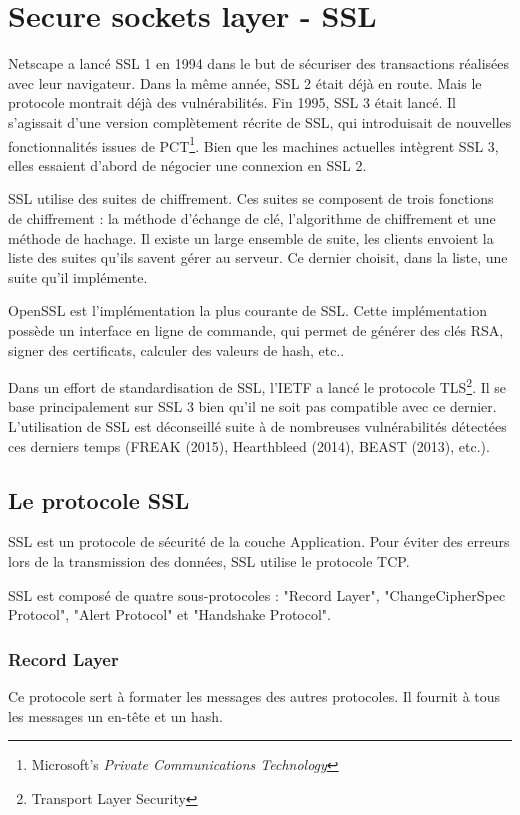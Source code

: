\section{Secure sockets layer - SSL}
Netscape a lancé SSL 1 en 1994 dans le but de sécuriser des transactions réalisées avec leur navigateur. 
Dans la même année, SSL 2 était déjà en route. 
Mais le protocole montrait déjà des vulnérabilités.
Fin 1995, SSL 3 était lancé. 
Il s'agissait d'une version complètement récrite de SSL, qui introduisait de nouvelles fonctionnalités issues de PCT\footnote{Microsoft's \textit{Private Communications Technology}}.
Bien que les machines actuelles intègrent SSL 3, elles essaient d'abord de négocier une connexion en SSL 2.

SSL utilise des suites de chiffrement. 
Ces suites se composent de trois fonctions de chiffrement : la méthode d'échange de clé, l'algorithme de chiffrement et une méthode de hachage. 
Il existe un large ensemble de suite, les clients envoient la liste des suites qu'ils savent gérer au serveur. 
Ce dernier choisit, dans la liste, une suite qu'il implémente. 

OpenSSL est l'implémentation la plus courante de SSL. 
Cette implémentation possède un interface en ligne de commande, qui permet de générer des clés RSA, signer des certificats, calculer des valeurs de hash, etc..

Dans un effort de standardisation de SSL, l'IETF a lancé le protocole TLS\footnote{Transport Layer Security}.
Il se base principalement sur SSL 3 bien qu'il ne soit pas compatible avec ce dernier.
L'utilisation de SSL est déconseillé suite à de nombreuses vulnérabilités détectées ces derniers temps (FREAK (2015), Hearthbleed (2014), BEAST (2013), etc.).

\subsection{Le protocole SSL}
SSL est un protocole de sécurité de la couche Application. 
Pour éviter des erreurs lors de la transmission des données, SSL utilise le protocole TCP.

SSL est composé de quatre sous-protocoles : "Record Layer", "ChangeCipherSpec Protocol", "Alert Protocol" et "Handshake Protocol".

\subsubsection{Record Layer}
Ce protocole sert à formater les messages des autres protocoles.
Il fournit à tous les messages un en-tête et un hash.

